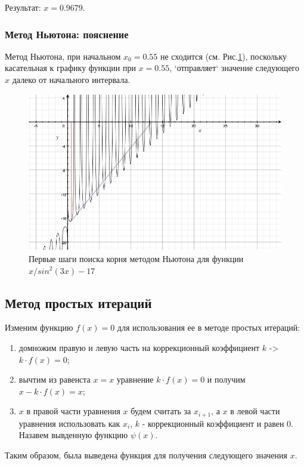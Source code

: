 \documentclass{article}
\begin{document}
Результат: $x = 0.9679$.

\subsubsection{Метод Ньютона: пояснение}
  Метод Ньютона, при начальном $x_{0} = 0.55$ не сходится (см.
  Рис.\ref{equ_newton_img}), поскольку касательная к графику функции при
  $x = 0.55$, `отправляет` значение следующего $x$ далеко от начального
  интервала.
  
  \begin{figure}[h!]
    \includegraphics[width=13cm]{equations_newton.png}
    \caption{Первые шаги поиска корня методом Ньютона для функции $x/sin^2(3x)
    - 17$}
    \label{equ_newton_img}
  \end{figure}

\subsection{Метод простых итераций}
Изменим функцию $f(x) = 0$ для использования ее в методе простых итераций:
\begin{enumerate}
  \item домножим правую и левую часть на коррекционный коэффициент
  $k$ -> $k \cdot f(x) = 0$;
  \item вычтим из равенста $x=x$ уравнение $k \cdot f(x) = 0$ и получим
  $x - k \cdot f(x) = x$;
  \item $x$ в правой части уравнения $x$ будем считать за $x_{i+1}$, а $x$ в
  левой части уравнения использовать как $x_i$, $k$ - коррекционный коэффициент и
  равен 0. Назавем вывденную функцию $\psi(x)$.
\end{enumerate} 
Таким образом, была выведена функция для получения следующего значения $x$.
\end{document}
